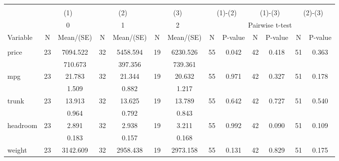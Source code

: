 
\begin{tabular}{@{\extracolsep{5pt}}lcccccccccccc}
\\[-1.8ex]\hline \hline \\[-1.8ex]
 & \multicolumn{2}{c}{(1)}  & \multicolumn{2}{c}{(2)}  & \multicolumn{2}{c}{(3)}  & \multicolumn{2}{c}{(1)-(2)} & \multicolumn{2}{c}{(1)-(3)} & \multicolumn{2}{c}{(2)-(3)} \\
 & \multicolumn{2}{c}{0}  & \multicolumn{2}{c}{1}  & \multicolumn{2}{c}{2}  & \multicolumn{6}{c}{Pairwise t-test}  \\
Variable & N & Mean/(SE) & N & Mean/(SE) & N & Mean/(SE) & N & P-value & N & P-value & N & P-value \\ \hline \\[-1.8ex] 
price   & 23    &  7094.522    & 32    &  5458.594    & 19    &  6230.526    & 55    &     0.042    & 42    &     0.418    & 51    &     0.363   \\
 &   &   710.673  &   &   397.356  &   &   739.361  &   &  &   &  &   &   \\
mpg   & 23    &    21.783    & 32    &    21.344    & 19    &    20.632    & 55    &     0.971    & 42    &     0.327    & 51    &     0.178   \\
 &   &     1.509  &   &     0.882  &   &     1.217  &   &  &   &  &   &   \\
trunk   & 23    &    13.913    & 32    &    13.625    & 19    &    13.789    & 55    &     0.642    & 42    &     0.727    & 51    &     0.540   \\
 &   &     0.964  &   &     0.792  &   &     0.843  &   &  &   &  &   &   \\
headroom   & 23    &     2.891    & 32    &     2.938    & 19    &     3.211    & 55    &     0.992    & 42    &     0.090    & 51    &     0.109   \\
 &   &     0.183  &   &     0.157  &   &     0.168  &   &  &   &  &   &   \\
weight   & 23    &  3142.609    & 32    &  2958.438    & 19    &  2973.158    & 55    &     0.131    & 42    &     0.829    & 51    &     0.175   \\

\end{tabular}

